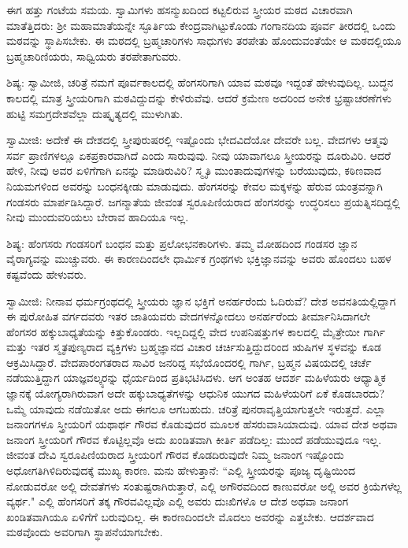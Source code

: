 ಈಗ ಹತ್ತು ಗಂಟೆಯ ಸಮಯ. ಸ್ವಾಮಿಗಳು ಹಸನ್ಮುಖದಿಂದ ಕಟ್ಟಲಿರುವ ಸ್ತ್ರೀಯರ ಮಠದ ವಿಚಾರವಾಗಿ ಮಾತೆತ್ತಿದರು: ಶ‍್ರೀ ಮಹಾಮಾತೆಯನ್ನೇ ಸ್ಫೂರ್ತಿಯ ಕೇಂದ್ರವಾಗಿಟ್ಟುಕೊಂಡು ಗಂಗಾನದಿಯ ಪೂರ್ವ ತೀರದಲ್ಲಿ ಒಂದು ಮಠವನ್ನು ಸ್ಥಾಪಿಸಬೇಕು. ಈ ಮಠದಲ್ಲಿ ಬ್ರಹ್ಮಚಾರಿಗಳು ಸಾಧುಗಳು ತರಪೇತು ಹೊಂದುವಂತೆಯೇ ಆ ಮಠದಲ್ಲಿಯೂ ಬ್ರಹ್ಮಚಾರಿಣಿಯರು, ಸಾಧ್ವಿಯರು ತರಪೇತಾಗುವರು.

ಶಿಷ್ಯ: ಸ್ವಾಮೀಜಿ, ಚರಿತ್ರೆ ನಮಗೆ ಪೂರ್ವಕಾಲದಲ್ಲಿ ಹೆಂಗಸರಿಗಾಗಿ ಯಾವ ಮಠವೂ ಇದ್ದಂತೆ ಹೇಳುವುದಿಲ್ಲ. ಬುದ್ಧನ ಕಾಲದಲ್ಲಿ ಮಾತ್ರ ಸ್ತ್ರೀಯರಿಗಾಗಿ ಮಠವಿದ್ದುದನ್ನು ಕೇಳಿರುವೆವು. ಆದರೆ ಕ್ರಮೇಣ ಅದರಿಂದ ಅನೇಕ ಭ್ರಷ್ಟಾಚರಣೆಗಳು ಹುಟ್ಟಿ ಸಮಗ್ರದೇಶವೆಲ್ಲಾ ದುಷ್ಕೃತ್ಯದಲ್ಲಿ ಮುಳುಗಿತು.

ಸ್ವಾಮೀಜಿ: ಅದೇಕೆ ಈ ದೇಶದಲ್ಲಿ ಸ್ತ್ರೀಪುರುಷರಲ್ಲಿ ಇಷ್ಟೊಂದು ಭೇದವಿದೆಯೋ ದೇವರೇ ಬಲ್ಲ. ವೇದಗಳು ಆತ್ಮವು ಸರ್ವ ಪ್ರಾಣಿಗಳಲ್ಲೂ ಏಕಪ್ರಕಾರವಾಗಿದೆ ಎಂದು ಸಾರುವುವು. ನೀವು ಯಾವಾಗಲೂ ಸ್ತ್ರೀಯರನ್ನು ದೂರುವಿರಿ. ಆದರೆ ಹೇಳಿ, ನೀವು ಅವರ ಏಳಿಗೆಗಾಗಿ ಏನನ್ನು ಮಾಡಿರುವಿರಿ? ಸ್ಮೃತಿ ಮುಂತಾದುವುಗಳನ್ನು ಬರೆಯುವುದು, ಕಠಿಣವಾದ ನಿಯಮಗಳಿಂದ ಅವರನ್ನು ಬಂಧನಕ್ಕೀಡು ಮಾಡುವುದು. ಹೆಂಗಸರನ್ನು ಕೇವಲ ಮಕ್ಕಳನ್ನು ಹೆರುವ ಯಂತ್ರವನ್ನಾಗಿ ಗಂಡಸರು ಮಾರ್ಪಡಿಸಿದ್ದಾರೆ. ಜಗನ್ಮಾತೆಯ ಜೀವಂತ ಸ್ವರೂಪಿಣಿಯರಾದ ಹೆಂಗಸರನ್ನು ಉದ್ಧರಿಸಲು ಪ್ರಯತ್ನಿಸದಿದ್ದಲ್ಲಿ ನೀವು ಮುಂದುವರಿಯಲು ಬೇರಾವ ಹಾದಿಯೂ ಇಲ್ಲ.

ಶಿಷ್ಯ: ಹೆಂಗಸರು ಗಂಡಸರಿಗೆ ಬಂಧನ ಮತ್ತು ಪ್ರಲೋಭನಕಾರಿಗಳು. ತಮ್ಮ ಮೋಹದಿಂದ ಗಂಡಸರ ಜ್ಞಾನ ವೈರಾಗ್ಯವನ್ನು ಮುಚ್ಚುವರು. ಈ ಕಾರಣದಿಂದಲೇ ಧಾರ್ಮಿಕ ಗ್ರಂಥಗಳು ಭಕ್ತಿಜ್ಞಾನವನ್ನು ಅವರು ಹೊಂದಲು ಬಹಳ ಕಷ್ಟವೆಂದು ಹೇಳುವರು.

ಸ್ವಾಮೀಜಿ: ನೀನಾವ ಧರ್ಮಗ್ರಂಥದಲ್ಲಿ ಸ್ತ್ರೀಯರು ಜ್ಞಾನ ಭಕ್ತಿಗೆ ಅನರ್ಹರೆಂದು ಓದಿರುವೆ? ದೇಶ ಅವನತಿಯಲ್ಲಿದ್ದಾಗ ಈ ಪುರೋಹಿತ ವರ್ಗದವರು ಇತರ ಜಾತಿಯವರು ವೇದಗಳನ್ನೋದಲು ಅನರ್ಹರೆಂದು ತೀರ್ಮಾನಿಸಿದಾಗಲೇ ಹೆಂಗಸರ ಹಕ್ಕುಬಾಧ್ಯತೆಯನ್ನು ಕಿತ್ತುಕೊಂಡರು. ಇಲ್ಲದಿದ್ದಲ್ಲಿ ವೇದ ಉಪನಿಷತ್ತುಗಳ ಕಾಲದಲ್ಲಿ ಮೈತ್ರೇಯೀ ಗಾರ್ಗಿ ಮತ್ತು ಇತರ ಸ್ಮೃತಪುಣ್ಯರಾದ ವ್ಯಕ್ತಿಗಳು ಬ್ರಹ್ಮಜ್ಞಾನದ ವಿಚಾರ ಚರ್ಚಿಸುತ್ತಿದ್ದುದರಿಂದ ಋಷಿಗಳ ಸ್ಥಳವನ್ನು ಕೂಡ ಆಕ್ರಮಿಸಿದ್ದಾರೆ. ವೇದಪಾರಂಗತರಾದ ಸಾವಿರ ಜನರಿದ್ದ ಸಭೆಯೊಂದರಲ್ಲಿ ಗಾರ್ಗಿ, ಬ್ರಹ್ಮನ ವಿಷಯದಲ್ಲಿ ಚರ್ಚೆ ನಡೆಯುತ್ತಿದ್ದಾಗ ಯಾಜ್ಞವಲ್ಕ್ಯರನ್ನು ಧೈರ್ಯದಿಂದ ಪ್ರತಿಭಟಿಸಿದಳು. ಆಗ ಅಂತಹ ಆದರ್ಶ ಮಹಿಳೆಯರು ಆಧ್ಯಾತ್ಮಿಕ ಜ್ಞಾನಕ್ಕೆ ಯೋಗ್ಯರಾಗಿರುವಾಗ ಅದೇ ಹಕ್ಕುಬಾಧ್ಯತೆಗಳನ್ನು ಆಧುನಿಕ ಯುಗದ ಮಹಿಳೆಯರಿಗೆ ಏಕೆ ಕೊಡಬಾರದು? ಒಮ್ಮೆ ಯಾವುದು ನಡೆಯಿತೋ ಅದು ಈಗಲೂ ಆಗಬಹುದು. ಚರಿತ್ರೆ ಪುನರಾವೃತ್ತಿಯಾಗುತ್ತಲೇ ಇರುತ್ತದೆ. ಎಲ್ಲಾ ಜನಾಂಗಗಳೂ ಸ್ತ್ರೀಯರಿಗೆ ಯಥಾರ್ಥ ಗೌರವ ಕೊಡುವುದರ ಮೂಲಕ ಹೆಸರುವಾಸಿಯಾದುವು. ಯಾವ ದೇಶ ಅಥವಾ ಜನಾಂಗ ಸ್ತ್ರೀಯರಿಗೆ ಗೌರವ ಕೊಟ್ಟಿಲ್ಲವೊ ಅದು ಖಂಡಿತವಾಗಿ ಕೀರ್ತಿ ಪಡೆದಿಲ್ಲ: ಮುಂದೆ ಪಡೆಯುವುದೂ ಇಲ್ಲ. ಜೀವಂತ ದೇವಿ ಸ್ವರೂಪಿಣಿಯರಾದ ಸ್ತ್ರೀಯರಿಗೆ ಗೌರವ ಕೊಡದಿರುವುದೇ ನಿಮ್ಮ ಜನಾಂಗ ಇಷ್ಟೊಂದು ಅಧೋಗತಿಗಿಳಿದಿರುವುದಕ್ಕೆ ಮುಖ್ಯ ಕಾರಣ. ಮನು ಹೇಳುತ್ತಾನೆ: “ಎಲ್ಲಿ ಸ್ತ್ರೀಯರನ್ನು ಪೂಜ್ಯ ದೃಷ್ಟಿಯಿಂದ ನೋಡುವರೋ ಅಲ್ಲಿ ದೇವತೆಗಳು ಸಂತುಷ್ಟರಾಗಿರುತ್ತಾರೆ, ಎಲ್ಲಿ ಅಗೌರವದಿಂದ ಕಾಣುವರೋ ಅಲ್ಲಿ ಅವರ ಕ್ರಿಯೆಗಳೆಲ್ಲ ವ್ಯರ್ಥ." ಎಲ್ಲಿ ಹೆಂಗಸರಿಗೆ ತಕ್ಕ ಗೌರವವಿಲ್ಲವೊ ಎಲ್ಲಿ ಅವರು ದುಃಖಿಗಳೊ ಆ ದೇಶ ಅಥವಾ ಜನಾಂಗ ಖಂಡಿತವಾಗಿಯೂ ಏಳಿಗೆಗೆ ಬರುವುದಿಲ್ಲ. ಈ ಕಾರಣದಿಂದಲೇ ಮೊದಲು ಅವರನ್ನು ಎತ್ತಬೇಕು. ಆದರ್ಶವಾದ ಮಠವೊಂದು ಅವರಿಗಾಗಿ ಸ್ಥಾಪನೆಯಾಗಬೇಕು.

